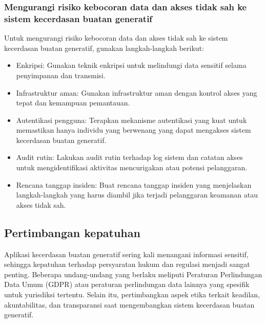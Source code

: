 \documentclass{article}
\begin{document}
\subsubsection{Mengurangi risiko kebocoran data dan akses tidak sah ke sistem kecerdasan buatan generatif}
Untuk mengurangi risiko kebocoran data dan akses tidak sah ke sistem kecerdasan buatan generatif, gunakan langkah-langkah berikut:
\begin{itemize}
    \item Enkripsi: Gunakan teknik enkripsi untuk melindungi data sensitif selama penyimpanan dan transmisi.
    \item Infrastruktur aman: Gunakan infrastruktur aman dengan kontrol akses yang tepat dan kemampuan pemantauan.
    \item Autentikasi pengguna: Terapkan mekanisme autentikasi yang kuat untuk memastikan hanya individu yang berwenang yang dapat mengakses sistem kecerdasan buatan generatif.
    \item Audit rutin: Lakukan audit rutin terhadap log sistem dan catatan akses untuk mengidentifikasi aktivitas mencurigakan atau potensi pelanggaran.
    \item Rencana tanggap insiden: Buat rencana tanggap insiden yang menjelaskan langkah-langkah yang harus diambil jika terjadi pelanggaran keamanan atau akses tidak sah.
\end{itemize}

\subsection{Pertimbangan kepatuhan}
Aplikasi kecerdasan buatan generatif sering kali menangani informasi sensitif, sehingga kepatuhan terhadap persyaratan hukum dan regulasi menjadi sangat penting. Beberapa undang-undang yang berlaku meliputi Peraturan Perlindungan Data Umum (GDPR) atau peraturan perlindungan data lainnya yang spesifik untuk yurisdiksi tertentu. Selain itu, pertimbangkan aspek etika terkait keadilan, akuntabilitas, dan transparansi saat mengembangkan sistem kecerdasan buatan generatif.
\end{document}
